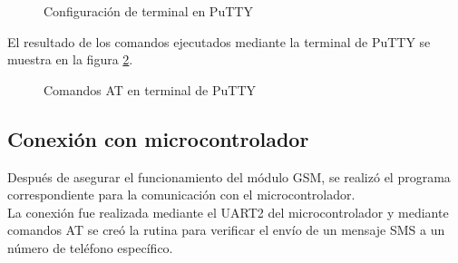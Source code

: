 	\begin{figure}[htbp!]
		\centering
		\caption{Configuración de terminal en PuTTY}
		\label{fig:ConfiguracionPutty}
	\end{figure}
 
El resultado de los comandos ejecutados mediante la terminal de PuTTY se muestra en la figura \ref{fig:TerminalPutty}.

	\begin{figure}[htbp!]
		\centering
		\caption{Comandos AT en terminal de PuTTY}
		\label{fig:TerminalPutty}
	\end{figure}
\pagebreak

\subsection{Conexión con microcontrolador}
Después de asegurar el funcionamiento del módulo GSM, se realizó el programa correspondiente para la comunicación con el microcontrolador.\\

La conexión fue realizada mediante el UART2 del microcontrolador y mediante comandos AT se creó la rutina para verificar el envío de un mensaje SMS a un número de teléfono específico.

